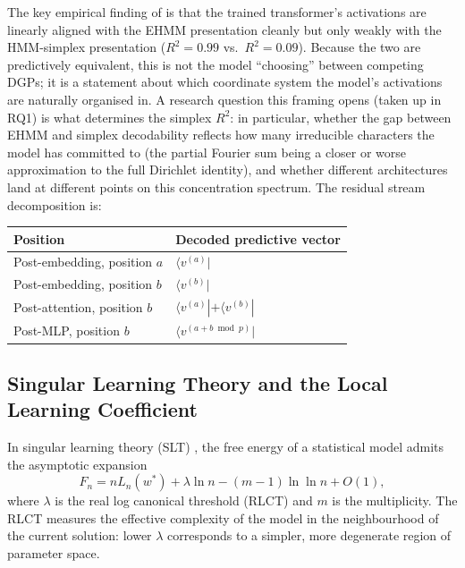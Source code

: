 \documentclass[11pt,a4paper]{article}
\begin{document}
The key empirical finding of \citet{poncini2025compmech} is that the trained transformer's activations are linearly aligned with the EHMM presentation cleanly but only weakly with the HMM-simplex presentation ($R^2 = 0.99$ vs.\ $R^2 = 0.09$). Because the two are predictively equivalent, this is not the model ``choosing'' between competing DGPs; it is a statement about which coordinate system the model's activations are naturally organised in. A research question this framing opens (taken up in RQ1) is what determines the simplex $R^2$: in particular, whether the gap between EHMM and simplex decodability reflects how many irreducible characters the model has committed to (the partial Fourier sum being a closer or worse approximation to the full Dirichlet identity), and whether different architectures land at different points on this concentration spectrum. The residual stream decomposition is:
\begin{center}
\begin{tabular}{ll}
\toprule
\textbf{Position} & \textbf{Decoded predictive vector} \\
\midrule
Post-embedding, position $a$ & $\langle v^{(a)} |$ \\
Post-embedding, position $b$ & $\langle v^{(b)} |$ \\
Post-attention, position $b$ & $\langle v^{(a)} | + \langle v^{(b)} |$ \\
Post-MLP, position $b$ & $\langle v^{(a+b \bmod p)} |$ \\
\bottomrule
\end{tabular}
\end{center}

\subsection{Singular Learning Theory and the Local Learning Coefficient}\label{sec:bg_slt}

In singular learning theory (SLT) \citep{watanabe2009algebraic}, the free energy of a statistical model admits the asymptotic expansion
\begin{equation}
    F_n = n L_n(w^*) + \lambda \ln n - (m-1) \ln \ln n + O(1),
\end{equation}
where $\lambda$ is the real log canonical threshold (RLCT) and $m$ is the multiplicity. The RLCT measures the effective complexity of the model in the neighbourhood of the current solution: lower $\lambda$ corresponds to a simpler, more degenerate region of parameter space.
\end{document}
